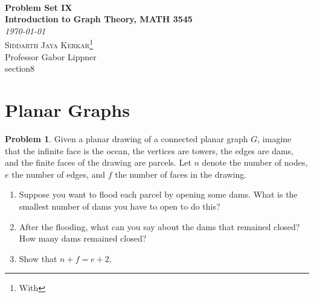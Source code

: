 \documentclass[12pt]{article}
\newcommand{\SheetTitle}[3]{
  {\noindent\Huge\bf  \\[0.5\baselineskip] {\fontfamily{cmr}\selectfont  Problem Set IX}}\\[2\baselineskip] %
  { {\bf \fontfamily{cmr}\selectfont #1}\\ {\textit{\fontfamily{cmr}\selectfont \today}}}    ~~~~~~~~~~~~~~~~~~~~~~~~~~~~~~~~~~~~~~~~~~~~~~~~~~~~~~~~     {\large \textsc{Siddarth Jaya Kerkar}\thanks{With #3}} \\
  {Professor Gabor Lippner}
  \\[1.4\baselineskip]}
\theoremstyle{definition}
\newtheorem{p}{Problem}
\begin{document}
\SheetTitle{Introduction to Graph Theory, MATH 3545}{I}

\setcounter{section}{8}
\section{Planar Graphs}

\vspace{0.9cm}
\begin{p}
  Given a planar drawing of a connected planar graph \( G \), imagine that the infinite face is the ocean, the vertices are towers, the edges are dams, and the finite faces of the drawing are parcels. Let \( n \) denote the number of nodes, \( e \) the number of edges, and \( f \) the number of faces in the drawing.
  
  \begin{enumerate}
      \item Suppose you want to flood each parcel by opening some dams. What is the smallest number of dams you have to open to do this?
      \item After the flooding, what can you say about the dams that remained closed? How many dams remained closed?
      \item Show that \( n + f = e + 2 \).
  \end{enumerate}
  \end{p}
  
\end{document}
